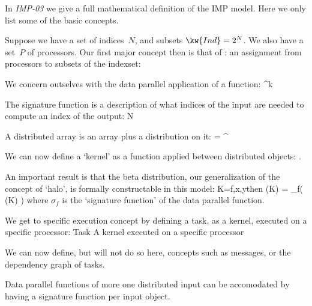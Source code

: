 In \emph{IMP-03} we give a full mathematical definition of the IMP model.
Here we only list some of the basic concepts.

Suppose we have a set of indices~$N$, and subsets $\kw{Ind}=2^N$.
We also have a set~$P$ of processors. Our first major concept then is that
of : an assignment from processors to subsets
of the indexset:
%
         {\equiv {} \rightarrow {}}

We concern outselves with the data parallel application of a function:
%
  { \equiv  {}^k\rightarrow {}}

The signature function is a description of what indices of the input are needed
to compute an index of the output:
%
         {\equiv N\rightarrow {}}

A distributed array is an array plus a distribution on it:
    { \equiv {}\circ{} = ^{}}

We can now define a `kernel' as a function applied between
distributed objects:
%
    {\equiv{}\times {}\times {}.}

An important result is that the beta distribution,
our generalization of the concept of `halo',
is formally constructable in this model:
%
    {K=\langle f,x,y\rangle\quad\hbox{then}\quad
    \beta(K) = \sigma_f\bigl( \gamma(K) \bigr)}
%
where $\sigma_f$ is the `signature function' of the data parallel function.

We get to specific execution concept by defining a task,
as a kernel, executed on a specific processor:
%
\DataType
    {Task}
    {A kernel executed on a specific processor}
    {\equiv{}\times{}}

We can now define, but will not do so here,
concepts such as messages, or the dependency graph of tasks.

\begin{remark}
 Data parallel functions of more one distributed input can be accomodated
 by having a signature function per input object.
\end{remark}
